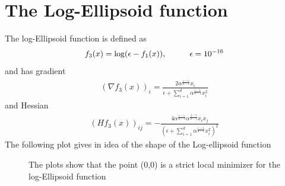 \documentclass[a4paper]{article}
\begin{document}
\section{The Log-Ellipsoid function}
The log-Ellipsoid function is defined as
\begin{align*}
  f_3(x) = \log(\epsilon-f_1(x)), \hspace*{10mm} \epsilon=10^{-16}
\end{align*}
and has gradient
\begin{align*}
  (\nabla f_3(x))_i = \frac{2\alpha^{\frac{i-1}{d-1}}x_i}{\epsilon + \sum_{i=1}^d \alpha^{\frac{i-1}{d-1}}x_i^2}
\end{align*}
and Hessian
\begin{align*}
  (Hf_3(x))_{ij} = -\frac{4\alpha^{\frac{i-1}{d-1}}\alpha^{\frac{j-1}{d-1}}x_ix_j}{(\epsilon + \sum_{i=1}^d \alpha^{\frac{i-1}{d-1}}x_i^2)^2}
\end{align*}
The following plot gives in idea of the shape of the Log-ellipsoid function
\begin{figure}[h]
    \centering
    \qquad
    \caption{The plots show that the point (0,0) is a strict local minimizer for the log-Ellipsoid function}%
    \label{fig:3}%
\end{figure}
\end{document}
